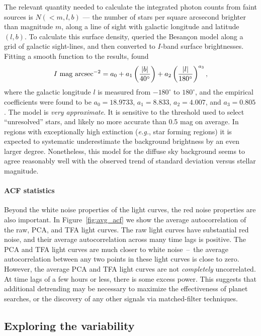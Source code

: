 \documentclass[12pt,twocolumn,tighten]{aastex62}
\begin{document}
The relevant quantity needed to calculate the integrated 
photon counts from faint sources
is  $N(<m,l,b)$ --- the number of stars per square arcsecond
brighter than magnitude $m$, along a line of sight with galactic
longitude and latitude $(l,b)$.
To calculate this surface density, \citet{winn_background_2013}
queried the Besan\c con model
\citep{robin_synthetic_2003}  along a grid of galactic sight-lines,
and then converted to $I$-band surface brightnesses.
Fitting a smooth function to the results, \citet{winn_background_2013}
found
\begin{equation}
I\ {\rm mag\ arcsec}^{-2} =
    a_0 + a_1 \left(\frac{|b|}{40^\circ}\right)
    + a_2 \left(\frac{|l|}{180^\circ}\right)^{a_3},
\end{equation}
where the galactic longitude $l$ is measured from $-180^\circ$ to
$180^\circ$, and the empirical coefficients were found to be $a_0 =
18.9733$, $a_1=8.833$, $a_2=4.007$, and $a_3=0.805$.  The model
is {\it very approximate}.  It is sensitive to the
threshold used to select ``unresolved'' stars, and likely no more
accurate than 0.5 mag on average.  In regions with exceptionally high
extinction ({\it e.g.}, star forming regions) it is expected to
systematic underestimate the background brightness by an even larger
degree.
Nonetheless, this model for the diffuse sky background seems
to agree reasonably well with the observed trend of standard deviation
versus stellar magnitude.


\paragraph{ACF statistics}

Beyond the white noise properties of the light curves, the red noise
properties are also important. 
In Figure~\ref{fig:avg_acf} we show the average autocorrelation of the
raw, PCA, and TFA light curves.
The raw light curves have substantial red noise, and
their average autocorrelation across many time lags is
positive.
The PCA and TFA light curves are much closer to white noise~--~the
average autocorrelation between any two points in these light curves
is close to zero.
However, the average PCA and TFA light curves are not {\it completely}
uncorrelated.
At time lags of a few hours or less, there is some excess power.
This suggests that additional detrending may be
necessary to maximize the effectiveness of planet searches, or the discovery of
any other signals via matched-filter techniques.


\subsection{Exploring the variability}
\label{subsec:identifying_variability}
\end{document}
